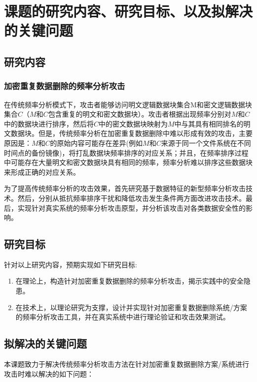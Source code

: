 \section{课题的研究内容、研究目标、以及拟解决的关键问题}
\subsection{研究内容}

\subsubsection*{加密重复数据删除的频率分析攻击}

在传统频率分析模式下，攻击者能够访问明文逻辑数据块集合M和密文逻辑数据块集合$C$（$M$和$C$包含重复的明文和密文数据块）。攻击者根据出现频率分别对$M$和$C$中的数据块进行排序，然后将$C$中的密文数据块映射为$M$中与其具有相同排名的明文数据块。但是，传统频率分析在加密重复数据删除中难以形成有效的攻击，主要原因是：$M$和$C$的原始内容可能存在差异(例如$M$和$C$来源于同一个文件系统在不同时间点的备份镜像)，将打乱数据块频率排序的对应关系；并且，在频率排序过程中可能存在大量明文和密文数据块具有相同的频率，频率分析难以排序这些数据块来形成正确的对应关系。

为了提高传统频率分析的攻击效果，首先研究基于数据特征的新型频率分析攻击技术。然后，分别从抵抗频率排序干扰和降低攻击发生条件两方面改进攻击技术。最后，实现针对真实系统的频率分析攻击原型，并分析该攻击对各类数据安全性的影响。


\subsection{研究目标}

针对以上研究内容，预期实现如下研究目标: 
\begin{enumerate}
    \item 在理论上，构造针对加密重复数据删除的频率分析攻击，揭示实践中的安全隐患。
    \item 在技术上，以理论研究为支撑，设计并实现针对加密重复数据删除系统/方案的频率分析攻击工具，并在真实系统中进行理论验证和攻击效果测试。 
\end{enumerate}


\subsection{拟解决的关键问题}

本课题致力于解决传统频率分析攻击方法在针对加密重复数据删除方案/系统进行攻击时难以解决的如下问题：

